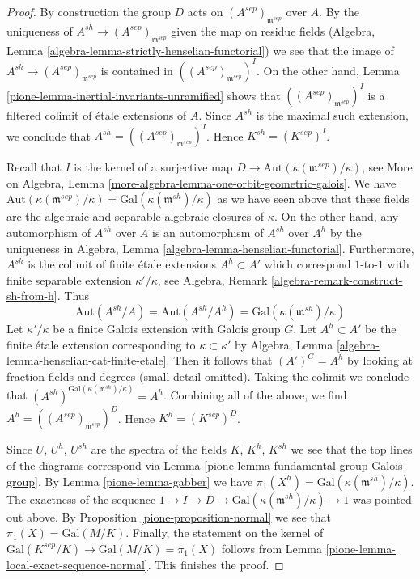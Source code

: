 \begin{proof}

By construction the group $D$ acts on $(A^{sep})_{\mathfrak m^{sep}}$
over $A$. By the uniqueness of $A^{sh} \to (A^{sep})_{\mathfrak m^{sep}}$
given the map on residue fields
(Algebra, Lemma \ref{algebra-lemma-strictly-henselian-functorial})
we see that the image of $A^{sh} \to (A^{sep})_{\mathfrak m^{sep}}$
is contained in $((A^{sep})_{\mathfrak m^{sep}})^I$.
On the other hand,
Lemma \ref{pione-lemma-inertial-invariants-unramified}
shows that $((A^{sep})_{\mathfrak m^{sep}})^I$
is a filtered colimit of \'etale extensions of $A$.
Since $A^{sh}$ is the maximal such extension, we conclude
that $A^{sh} = ((A^{sep})_{\mathfrak m^{sep}})^I$.
Hence $K^{sh} = (K^{sep})^I$.

\medskip\noindent
Recall that $I$ is the kernel of a surjective map
$D \to \text{Aut}(\kappa(\mathfrak m^{sep})/\kappa)$, see
More on Algebra, Lemma \ref{more-algebra-lemma-one-orbit-geometric-galois}.
We have $\text{Aut}(\kappa(\mathfrak m^{sep})/\kappa) =
\text{Gal}(\kappa(\mathfrak m^{sh})/\kappa)$
as we have seen above that these fields are the algebraic
and separable algebraic closures of $\kappa$.
On the other hand, any automorphism of $A^{sh}$ over $A$
is an automorphism of $A^{sh}$ over $A^h$ by the uniqueness
in Algebra, Lemma \ref{algebra-lemma-henselian-functorial}.
Furthermore, $A^{sh}$ is the colimit of finite \'etale
extensions $A^h \subset A'$ which correspond $1$-to-$1$
with finite separable extension $\kappa'/\kappa$, see
Algebra, Remark \ref{algebra-remark-construct-sh-from-h}.
Thus
$$
\text{Aut}(A^{sh}/A) = \text{Aut}(A^{sh}/A^h) =
\text{Gal}(\kappa(\mathfrak m^{sh})/\kappa)
$$
Let $\kappa'/\kappa$ be a finite Galois extension with
Galois group $G$. Let $A^h \subset A'$ be the finite \'etale extension
corresponding to $\kappa \subset \kappa'$ by
Algebra, Lemma \ref{algebra-lemma-henselian-cat-finite-etale}.
Then it follows that
$(A')^G = A^h$ by looking at fraction fields and degrees
(small detail omitted). Taking the colimit we conclude that
$(A^{sh})^{\text{Gal}(\kappa(\mathfrak m^{sh})/\kappa)} = A^h$.
Combining all of the above, we find $A^h = ((A^{sep})_{\mathfrak m^{sep}})^D$.
Hence $K^h = (K^{sep})^D$.

\medskip\noindent
Since $U$, $U^h$, $U^{sh}$ are the spectra of the fields
$K$, $K^h$, $K^{sh}$ we see that the top lines of the diagrams
correspond via
Lemma \ref{pione-lemma-fundamental-group-Galois-group}.
By Lemma \ref{pione-lemma-gabber} we have
$\pi_1(X^h) = \text{Gal}(\kappa(\mathfrak m^{sh})/\kappa)$.
The exactness of the sequence
$1 \to I \to D \to \text{Gal}(\kappa(\mathfrak m^{sh})/\kappa) \to 1$
was pointed out above.
By Proposition \ref{pione-proposition-normal}
we see that $\pi_1(X) = \text{Gal}(M/K)$.
Finally, the statement on the kernel of
$\text{Gal}(K^{sep}/K) \to \text{Gal}(M/K) = \pi_1(X)$
follows from Lemma \ref{pione-lemma-local-exact-sequence-normal}.
This finishes the proof.
\end{proof}

